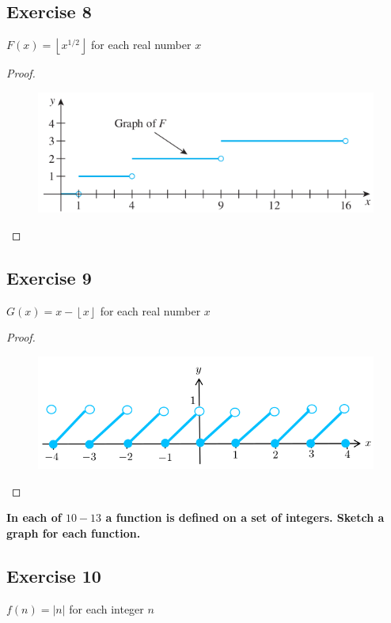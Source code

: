 \documentclass[14pt]{extarticle}
\newcommand{\cy}{\color{cyan}}
\newcommand{\floor}[1]{{\left\lfloor#1\right\rfloor}}
\begin{document}
\subsection{Exercise 8}
\(F(x) = \floor{x^{1/2}}\) for each real number \(x\)

\begin{proof}
    \begin{figure}[ht!]
        \centering
        \includegraphics[scale=0.5]{../images/11.1.8.png}
    \end{figure}
\end{proof}

\subsection{Exercise 9}
\(G(x) = x - \floor{x}\) for each real number \(x\)

\begin{proof}
    \begin{figure}[ht!]
        \centering
        \includegraphics[scale=0.5]{../images/11.1.9.png}
    \end{figure}
\end{proof}

{\bf \cy In each of \(10-13\) a function is defined on a set of integers. Sketch a graph for each function.}

\subsection{Exercise 10}
\(f(n) = |n|\) for each integer \(n\)
\end{document}
